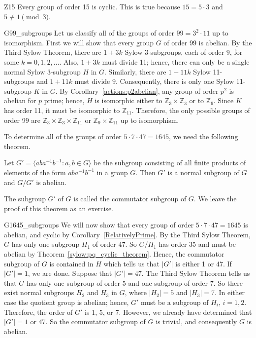  
\begin{example}{Z15}
Every group of order 15 is cyclic.  This is true because $15 = 5 \cdot
3$ and $5 \not\equiv 1 \pmod{3}$. 
\end{example}
 
 
\begin{example}{G99_subgroups}
Let us classify all of the groups of order $99 = 3^2 \cdot 11$ up to
isomorphism. First we will show that every group $G$ of order 99 is
abelian.  By the Third Sylow Theorem, there are $1 + 3k$ Sylow
3-subgroups, each of order $9$, for some $k = 0, 1, 2, \ldots$.  Also,
$1 + 3k$ must divide 11; hence, there can only be a single normal
Sylow 3-subgroup $H$ in $G$.  Similarly, there are $1 +11k$ Sylow
11-subgroups and $1 +11k$ must divide $9$.  Consequently, there is
only one Sylow 11-subgroup $K$ in $G$.  By Corollary~\ref{actions:p2abelian}, any group
of order $p^2$ is abelian for $p$ prime; hence, $H$ is isomorphic either 
to ${\mathbb Z}_3 \times {\mathbb Z}_3$ or to ${\mathbb Z}_9$.  Since $K$ has 
order 11, it must be isomorphic to ${\mathbb Z}_{11}$.  Therefore, the only
possible groups of order 99 are ${\mathbb Z}_3 \times {\mathbb Z}_3 \times
{\mathbb Z}_{11}$ or ${\mathbb Z}_9 \times {\mathbb Z}_{11}$ up to isomorphism.
\end{example}
 

 
 
To determine all of the groups of order $5 \cdot 7 \cdot 47 = 1645$,
we need the following theorem. 
 
 
\begin{theorem}\label{sylow:commutator_subgroup_theorem}
Let $G' = \langle a b a^{-1} b^{-1} : a, b \in G \rangle$ be the
subgroup  consisting of all finite products of elements of the form
$aba^{-1}b^{-1}$ in a group $G$. Then $G'$ is a normal subgroup of $G$
and $G/G'$ is abelian. 
\end{theorem}
 
 
The subgroup $G'$ of $G$ is called the {\bfi commutator
subgroup\/} of $G$. We leave the proof of
this theorem as an exercise. 
 
 
\begin{example}{G1645_subgroups}
We will now show that every group of order $5 \cdot 7 \cdot 47 =
1645$ is abelian, and cyclic by Corollary~\ref{RelativelyPrime}. By the Third Sylow
Theorem, $G$ has only one subgroup $H_1$ of order $47$.  So $G/H_1$
has order 35 and must be abelian by Theorem~\ref{sylow:pq_cyclic_theorem}. Hence, the
commutator subgroup of $G$ is contained in $H$ which tells us that
$|G'|$ is either 1 or 47. If $|G'|=1$, we are done. Suppose that
$|G'|=47$. The Third Sylow Theorem tells us that $G$ has only one
subgroup of order 5 and one subgroup of order 7.  So there exist
normal subgroups $H_2$  and $H_3$ in $G$, where $|H_2| = 5$ and $|H_3|
= 7$. In either case the quotient group is abelian; hence, $G'$ must
be a subgroup of $H_i$, $i= 1, 2$. Therefore, the order of $G'$ is 1,
5, or 7. However, we already have determined that $|G'| =1$ or 47. So
the commutator subgroup of $G$ is trivial, and consequently $G$ is
abelian.
\end{example}
 
